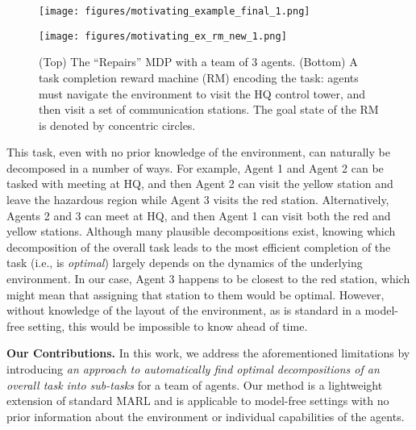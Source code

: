 \begin{figure}[t]
\centering
    \begin{minipage}[b]{0.49\textwidth}
        \centering
        \texttt{[image: figures/motivating\_example\_final\_1.png]}
    \end{minipage}
    \begin{minipage}[b]{0.49\textwidth}
    \texttt{[image: figures/motivating\_ex\_rm\_new\_1.png]}
    \end{minipage}
\caption{(Top) The ``Repairs'' MDP with a team of 3 agents. (Bottom) A task completion reward machine (RM) encoding the task: agents must navigate the environment to visit the HQ control tower, and then visit a set of communication stations. The goal state of the RM is denoted by concentric circles.}
\label{fig:running_example}
\end{figure} 

This task, even with no prior knowledge of the environment, can naturally be decomposed in a number of ways. For example, Agent 1 and Agent 2 can be tasked with meeting at HQ, and then Agent 2 can visit the yellow station and leave the hazardous region while Agent 3 visits the red station. Alternatively, Agents 2 and 3 can meet at HQ, and then Agent 1 can visit both the red and yellow stations. Although many plausible decompositions exist, knowing which decomposition of the overall task leads to the most efficient completion of the task (i.e., is \textit{optimal}) largely depends on the dynamics of the underlying environment. In our case, Agent 3 happens to be closest to the red station, which might mean that assigning that station to them would be optimal. However, without knowledge of the layout of the environment, as is standard in a model-free setting, this would be impossible to know ahead of time.


\textbf{Our Contributions.} In this work, we address the aforementioned limitations by introducing {\em an approach to automatically find optimal decompositions of an overall task into sub-tasks} for a team of agents. Our method is a lightweight extension of standard MARL and is applicable to model-free settings with no prior information about the environment or individual capabilities of the agents. 

